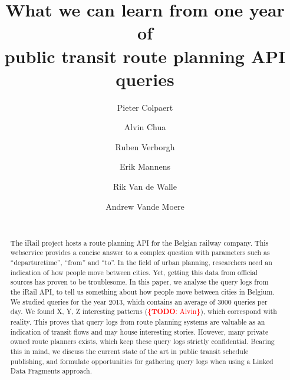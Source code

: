 \documentclass{sig-alternate}
\newcommand{\todo}[1]{\noindent\textcolor{red}{{\bf \{TODO}: #1{\bf \}}}}
\begin{document}
\title{What we can learn from one year of\\ public transit route planning API queries}
\author{
\alignauthor
Pieter Colpaert\\
\and
\alignauthor
Alvin Chua\\
\and
\alignauthor
Ruben Verborgh\\
\and
\alignauthor
Erik Mannens\\
\and
\alignauthor
Rik Van de Walle\\
\and
\alignauthor
Andrew Vande Moere\\
\\
}

\maketitle
\begin{abstract}
The iRail project hosts a route planning API for the Belgian railway company.
This webservice provides a concise answer to a complex question with parameters such as ``departuretime'', ``from'' and ``to''.
In the field of urban planning, researchers need an indication of how people move between cities. 
Yet, getting this data from official sources has proven to be troublesome.
In this paper, we analyse the query logs from the iRail API, to tell us something about how people move between cities in Belgium.
We studied queries for the year 2013, which contains an average of 3000 queries per day.
We found X, Y, Z interesting patterns (\todo{Alvin}), which correspond with reality.
This proves that query logs from route planning systems are valuable as an indication of transit flows and may house interesting stories.
However, many private owned route planners exists, which keep these query logs strictly confidential.
Bearing this in mind, we discuss the current state of the art in public transit schedule publishing, and formulate opportunities for gathering query logs when using a Linked Data Fragments approach.

\end{abstract}
\end{document}
